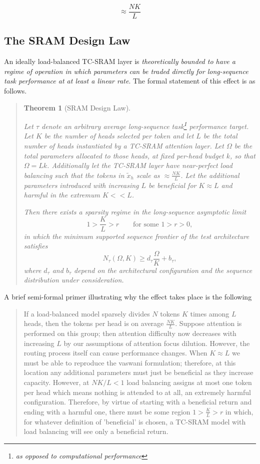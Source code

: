 \documentclass[11pt]{article}
\newtheorem{theorem}{Theorem}
\begin{document}
\[
\approx \frac{NK}{L}
\]

\subsection{The SRAM Design Law}

An ideally load-balanced TC-SRAM layer is \emph{theoretically bounded to have a regime of operation in which parameters can be traded directly for long-sequence task performance at at least a linear rate}. The formal statement of this effect is as follows.

\begin{quote}
\begin{theorem}[SRAM Design Law]
\label{theorem}

Let $\tau$ denote an arbitrary average long-sequence \emph{task}\footnote{as opposed to computational performance} performance target. Let $K$ be the number of heads selected per token and let $L$ be the total number of heads instantiated by a TC-SRAM attention layer. Let $\Omega$ be the total parameters allocated to those heads, at fixed per-head budget $k$, so that $\Omega=Lk$. Additionally let the TC-SRAM layer have near-perfect load balancing such that the tokens in $\tilde{x}_h$ scale as $\approx \frac{NK}{L}$. Let the additional parameters introduced with increasing $L$ be beneficial for $K \approx L$ and harmful in the extremum $K << L$.

Then there exists a sparsity regime in the long-sequence asymptotic limit
\[
1 > \frac{K}{L} > r
\qquad\text{for some } 1>r>0,
\]
in which the minimum supported sequence frontier of the test architecture satisfies
\[
N_\tau(\Omega,K) \ge d_\tau \frac{\Omega}{K} + b_\tau,
\]
where $d_\tau$ and $b_\tau$ depend on the architectural configuration and the sequence distribution under consideration.
\end{theorem}
\end{quote}

A brief semi-formal primer illustrating why the effect takes place is the following

\begin{quote}
If a load-balanced model sparsely divides $N$ tokens $K$ times among $L$ heads, then the tokens per head is on average $\frac{NK}{L}$. Suppose attention is performed on this group; then attention difficulty now decreases with increasing $L$ by our assumptions of attention focus dilution. However, the routing process itself can cause performance changes. When $K \approx L$ we must be able to reproduce the vaswani formulation; therefore, at this location any additional parameters must just be beneficial as they increase capacity. However, at $NK/L < 1$ load balancing assigns at most one token per head which means nothing is attended to at all, an extremely harmful configuration. Therefore, by virtue of starting with a beneficial return and ending with a harmful one, there must be some region $1 > \frac{K}{L} > r$ in which, for whatever definition of 'beneficial' is chosen, a TC-SRAM model with load balancing will see only a beneficial return.
\end{quote}
\end{document}
